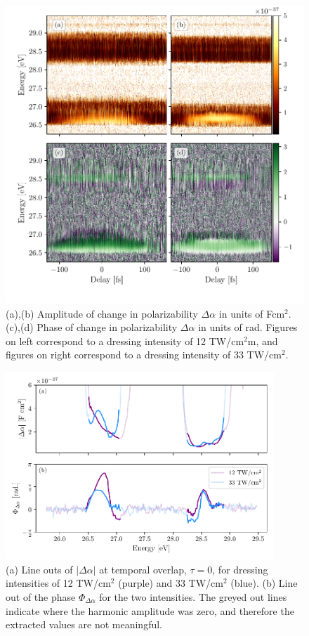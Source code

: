 \begin{figure}
	\centering
	\includegraphics[width=1.0\textwidth]{figures/CATS/amp_ph_delay.pdf}
	\caption[Polarizability amplitude and phase extracted from CATS measurement for two dressing intensities]{(a),(b) Amplitude of change in polarizability $\Delta\alpha$ in units of Fcm$^2$. (c),(d) Phase of change in polarizability $\Delta\alpha$ in units of rad.  Figures on left correspond to a dressing intensity of 12 TW/cm$^2$m, and figures on right correspond to a dressing intensity of 33 TW/cm$^2$.}
	\label{fig:amp_ph_delay}
\end{figure}

\begin{figure}
	\centering
	\includegraphics[width=0.9\textwidth]{figures/CATS/amp_ph_lineout.pdf}
	\caption[Line outs of $\lvert\Delta\alpha\rvert$ and $\Phi_{\Delta\alpha}$ at $\tau=0$ using CATS]{(a) Line outs of $\lvert\Delta\alpha\rvert$ at temporal overlap, $\tau=0$, for dressing intensities of 12 TW/cm$^2$ (purple) and 33 TW/cm$^2$ (blue). (b) Line out of the phase $\Phi_{\Delta\alpha}$ for the two intensities.  The greyed out lines indicate where the harmonic amplitude was zero, and therefore the extracted values are not meaningful.}
	\label{fig:amp_ph_lineout}
\end{figure}


